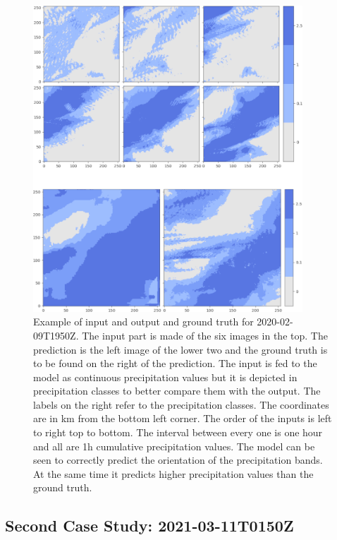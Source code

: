 \begin{figure}[!h]
    \centering
    \includegraphics[width=0.9\textwidth]{2002091950.png}
    \caption{Example of input and output and ground truth for 2020-02-09T1950Z. The input part is made of the six images in the top. The prediction is the left image of the lower two and the ground truth is to be found on the right of the prediction. The input is fed to the model as continuous precipitation values but it is depicted in precipitation classes to better compare them with the output. The labels on the right refer to the precipitation classes. The coordinates are in km from the bottom left corner. The order of the inputs is left to right top to bottom. The interval between every one is one hour and all are 1h cumulative precipitation values. The model can be seen to correctly predict the orientation of the precipitation bands. At the same time it predicts higher precipitation values than the ground truth.}
    \label{fig:examplescene1}
\end{figure}

\subsection{Second Case Study: 2021-03-11T0150Z}

